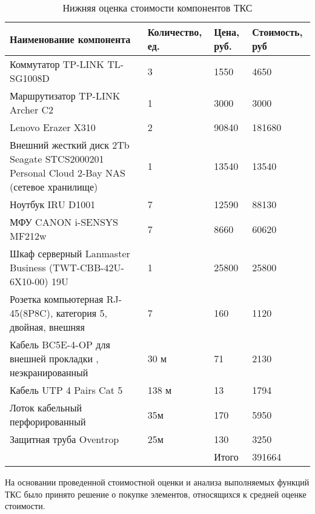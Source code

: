 \begin{table}[H]
  \centering
  \caption{Нижняя оценка стоимости компонентов ТКС}
  \begin{tabular}{|p{7cm}|l|l|l|} \hline
    Наименование компонента & Количество, ед. & Цена, руб.& Стоимость, руб \\ \hline
    Коммутатор TP-LINK TL-SG1008D & 3 & 1550 & 4650 \\ \hline
    Маршрутизатор TP-LINK Archer C2 & 1 & 3000 & 3000 \\ \hline
    Lenovo Erazer X310 & 2 & 90840 & 181680 \\ \hline
    Внешний жесткий диск 2Tb Seagate STCS2000201 Personal Cloud 2-Bay NAS
(сетевое хранилище) & 1 & 13540 & 13540 \\ \hline
    Ноутбук IRU D1001 & 7 & 12590 & 88130 \\ \hline
    МФУ CANON i-SENSYS MF212w & 7 & 8660 & 60620 \\ \hline
    Шкаф серверный Lanmaster Business (TWT-CBB-42U-6X10-00) 19U & 1 & 25800 & 25800 \\ \hline
    Розетка компьютерная RJ-45(8P8C), категория 5, двойная, внешняя & 7 & 160 & 1120 \\ \hline
    Кабель BC5E-4-OP для внешней прокладки , неэкранированный & 30 м & 71 & 2130 \\ \hline
    Кабель UTP 4 Pairs Cat 5 & 138 м & 13 & 1794 \\ \hline
    Лоток кабельный перфорированный & 35м & 170 & 5950 \\ \hline
    Защитная труба Oventrop & 25м & 130 & 3250 \\ \hline
    & & Итого & 391664 \\ \hline
  \end{tabular}
  \label{tab:ests}
\end{table}

На основании проведенной стоимостной оценки и анализа выполняемых функций ТКС было принято решение о покупке элементов, относящихся к средней оценке стоимости.